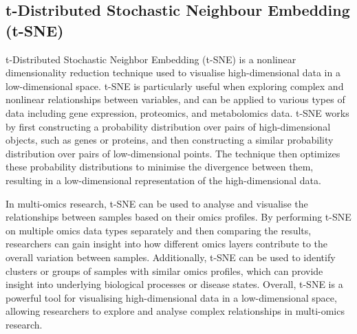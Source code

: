 \documentclass[
]{book}
\newenvironment{Shaded}{\begin{snugshade}}{\end{snugshade}}
\newcommand{\AttributeTok}[1]{\textcolor[rgb]{0.77,0.63,0.00}{#1}}
\newcommand{\CommentTok}[1]{\textcolor[rgb]{0.56,0.35,0.01}{\textit{#1}}}
\newcommand{\ConstantTok}[1]{\textcolor[rgb]{0.00,0.00,0.00}{#1}}
\newcommand{\DecValTok}[1]{\textcolor[rgb]{0.00,0.00,0.81}{#1}}
\newcommand{\FunctionTok}[1]{\textcolor[rgb]{0.00,0.00,0.00}{#1}}
\newcommand{\NormalTok}[1]{#1}
\newcommand{\OtherTok}[1]{\textcolor[rgb]{0.56,0.35,0.01}{#1}}
\newcommand{\SpecialCharTok}[1]{\textcolor[rgb]{0.00,0.00,0.00}{#1}}
\newcommand{\StringTok}[1]{\textcolor[rgb]{0.31,0.60,0.02}{#1}}
\begin{document}
\normalsize

\hypertarget{t-sne}{%
\subsection{t-Distributed Stochastic Neighbour Embedding (t-SNE)}\label{t-sne}}

t-Distributed Stochastic Neighbor Embedding (t-SNE) is a nonlinear dimensionality reduction technique used to visualise high-dimensional data in a low-dimensional space. t-SNE is particularly useful when exploring complex and nonlinear relationships between variables, and can be applied to various types of data including gene expression, proteomics, and metabolomics data. t-SNE works by first constructing a probability distribution over pairs of high-dimensional objects, such as genes or proteins, and then constructing a similar probability distribution over pairs of low-dimensional points. The technique then optimizes these probability distributions to minimise the divergence between them, resulting in a low-dimensional representation of the high-dimensional data.

In multi-omics research, t-SNE can be used to analyse and visualise the relationships between samples based on their omics profiles. By performing t-SNE on multiple omics data types separately and then comparing the results, researchers can gain insight into how different omics layers contribute to the overall variation between samples. Additionally, t-SNE can be used to identify clusters or groups of samples with similar omics profiles, which can provide insight into underlying biological processes or disease states. Overall, t-SNE is a powerful tool for visualising high-dimensional data in a low-dimensional space, allowing researchers to explore and analyse complex relationships in multi-omics research.

\small

\begin{Shaded}
\end{Shaded}
\end{document}
